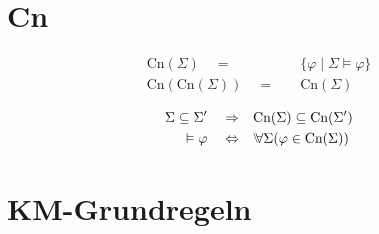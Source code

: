 \documentclass{scrartcl}
\newcommand{\gdw}{\quad\Leftrightarrow\quad &}
\newcommand{\dann}{\quad\Rightarrow\quad &}
\newcommand{\is}{\quad = \quad &}
\renewcommand{\phi}{\varphi}
\newcommand{\teilm}{\subseteq}
\newcommand{\Cn}{\text{Cn}}
\newcommand{\Forall}{\raisebox{0.15em}{\scalebox{0.72}{$\backslash$}}\hspace{-0.18em}\forall}
\begin{document}
\section{Cn}
\begin{minipage}[b]{0.5\linewidth}
\begin{align*}
\Cn(\Sigma) \is \{\phi \mid \Sigma \vDash \phi\} \\
\Cn(\Cn(\Sigma)) \is \Cn(\Sigma)
\end{align*}
\end{minipage}
\begin{minipage}[b]{0.5\linewidth}
\begin{align*}
\Sigma \teilm \Sigma' \dann \text{Cn}(\Sigma) \teilm \text{Cn}(\Sigma') \\
\vDash \phi \gdw \Forall \Sigma(\phi \in \Cn(\Sigma))
\end{align*}
\end{minipage}

\section{KM-Grundregeln}
\end{document}
